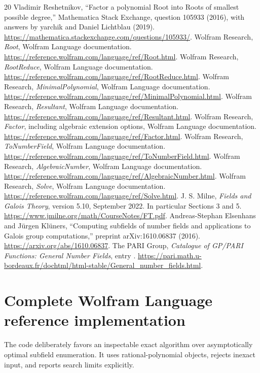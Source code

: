 \documentclass[11pt]{article}
\newcommand{\code}[1]{\texttt{\detokenize{#1}}}
\theoremstyle{definition}\newtheorem{definition}[theorem]{Definition}
\theoremstyle{remark}\newtheorem{remark}[theorem]{Remark}
\begin{document}
\begingroup\small
\begin{thebibliography}{20}
\setlength{\itemsep}{3pt}
 Vladimir Reshetnikov, ``Factor a polynomial Root into Roots of smallest possible degree,'' Mathematica Stack Exchange, question 105933 (2016), with answers by yarchik and Daniel Lichtblau (2019).
\url{https://mathematica.stackexchange.com/questions/105933/}.
 Wolfram Research, \emph{Root}, Wolfram Language documentation.
\url{https://reference.wolfram.com/language/ref/Root.html}.
 Wolfram Research, \emph{RootReduce}, Wolfram Language documentation.
\url{https://reference.wolfram.com/language/ref/RootReduce.html}.
 Wolfram Research, \emph{MinimalPolynomial}, Wolfram Language documentation.
\url{https://reference.wolfram.com/language/ref/MinimalPolynomial.html}.
 Wolfram Research, \emph{Resultant}, Wolfram Language documentation.
\url{https://reference.wolfram.com/language/ref/Resultant.html}.
 Wolfram Research, \emph{Factor}, including algebraic extension options, Wolfram Language documentation.
\url{https://reference.wolfram.com/language/ref/Factor.html}.
 Wolfram Research, \emph{ToNumberField}, Wolfram Language documentation.
\url{https://reference.wolfram.com/language/ref/ToNumberField.html}.
 Wolfram Research, \emph{AlgebraicNumber}, Wolfram Language documentation.
\url{https://reference.wolfram.com/language/ref/AlgebraicNumber.html}.
 Wolfram Research, \emph{Solve}, Wolfram Language documentation.
\url{https://reference.wolfram.com/language/ref/Solve.html}.
 J. S. Milne, \emph{Fields and Galois Theory}, version 5.10, September 2022. In particular Sections 3 and 5.
\url{https://www.jmilne.org/math/CourseNotes/FT.pdf}.
 Andreas-Stephan Elsenhans and J\"urgen Kl\"uners, ``Computing subfields of number fields and applications to Galois group computations,'' preprint arXiv:1610.06837 (2016).
\url{https://arxiv.org/abs/1610.06837}.
 The PARI Group, \emph{Catalogue of GP/PARI Functions: General Number Fields}, entry \code{nfsubfields}.
\url{https://pari.math.u-bordeaux.fr/dochtml/html-stable/General_number_fields.html}.
\end{thebibliography}
\endgroup

\appendix
\newpage
\section{Complete Wolfram Language reference implementation}
\label{app:code}
The code deliberately favors an inspectable exact algorithm over asymptotically
optimal subfield enumeration. It uses rational-polynomial \code{Root} objects,
rejects inexact input, and reports search limits explicitly.

\end{document}
